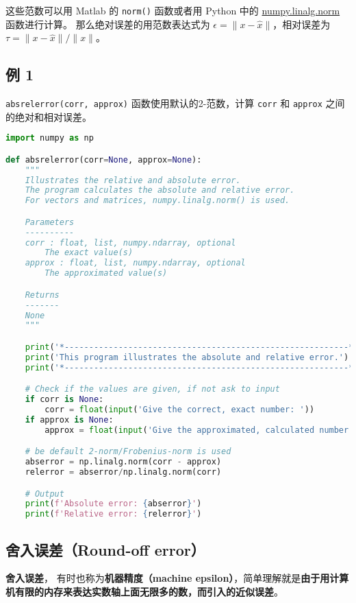 这些范数可以用 Matlab 的 \verb|norm()| 函数或者用 Python 中的 \href{https://docs.scipy.org/doc/numpy/reference/generated/numpy.linalg.norm.html}{numpy.linalg.norm} 函数进行计算。 那么绝对误差的用范数表达式为 $\epsilon=\|x-\hat{x}\|$，相对误差为  $\tau={\|x-\hat{x}\|}/{\|x\|}$。

\subsection{例 1}
\verb|absrelerror(corr, approx)| 函数使用默认的2-范数，计算 \verb|corr| 和 \verb|approx| 之间的绝对和相对误差。

\begin{lstlisting}[language=python]
import numpy as np

def absrelerror(corr=None, approx=None):
    """ 
    Illustrates the relative and absolute error.
    The program calculates the absolute and relative error. 
    For vectors and matrices, numpy.linalg.norm() is used.

    Parameters
    ----------
    corr : float, list, numpy.ndarray, optional
        The exact value(s)
    approx : float, list, numpy.ndarray, optional
        The approximated value(s)

    Returns
    -------
    None
    """

    print('*----------------------------------------------------------*')
    print('This program illustrates the absolute and relative error.')
    print('*----------------------------------------------------------*')

    # Check if the values are given, if not ask to input
    if corr is None:
        corr = float(input('Give the correct, exact number: '))
    if approx is None:
        approx = float(input('Give the approximated, calculated number: '))

    # be default 2-norm/Frobenius-norm is used
    abserror = np.linalg.norm(corr - approx)
    relerror = abserror/np.linalg.norm(corr)

    # Output
    print(f'Absolute error: {abserror}')
    print(f'Relative error: {relerror}')
\end{lstlisting}

\subsection{舍入误差（Round-off error）}

\textbf{舍入误差}， 有时也称为\textbf{机器精度（machine epsilon）}，简单理解就是\textbf{由于用计算机有限的内存来表达实数轴上面无限多的数，而引入的近似误差}。

